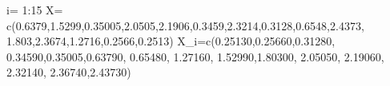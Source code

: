 \documentclass[
  a4paper,
  oneside,
  openany]{book}
\newenvironment{Shaded}{\begin{snugshade}}{\end{snugshade}}
\newcommand{\DecValTok}[1]{\textcolor[rgb]{0.00,0.00,0.81}{#1}}
\newcommand{\FloatTok}[1]{\textcolor[rgb]{0.00,0.00,0.81}{#1}}
\newcommand{\FunctionTok}[1]{\textcolor[rgb]{0.00,0.00,0.00}{#1}}
\newcommand{\NormalTok}[1]{#1}
\newcommand{\OtherTok}[1]{\textcolor[rgb]{0.56,0.35,0.01}{#1}}
\newcommand{\SpecialCharTok}[1]{\textcolor[rgb]{0.00,0.00,0.00}{#1}}
\begin{document}
\begin{Shaded}
\begin{Highlighting}[]
\NormalTok{i}\OtherTok{=} \DecValTok{1}\SpecialCharTok{:}\DecValTok{15}
\NormalTok{X}\OtherTok{=} \FunctionTok{c}\NormalTok{(}\FloatTok{0.6379}\NormalTok{,}\FloatTok{1.5299}\NormalTok{,}\FloatTok{0.35005}\NormalTok{,}\FloatTok{2.0505}\NormalTok{,}\FloatTok{2.1906}\NormalTok{,}\FloatTok{0.3459}\NormalTok{,}\FloatTok{2.3214}\NormalTok{,}\FloatTok{0.3128}\NormalTok{,}\FloatTok{0.6548}\NormalTok{,}\FloatTok{2.4373}\NormalTok{,}
               \FloatTok{1.803}\NormalTok{,}\FloatTok{2.3674}\NormalTok{,}\FloatTok{1.2716}\NormalTok{,}\FloatTok{0.2566}\NormalTok{,}\FloatTok{0.2513}\NormalTok{)}
\NormalTok{X\_i}\OtherTok{=}\FunctionTok{c}\NormalTok{(}\FloatTok{0.25130}\NormalTok{,}\FloatTok{0.25660}\NormalTok{,}\FloatTok{0.31280}\NormalTok{, }\FloatTok{0.34590}\NormalTok{,}\FloatTok{0.35005}\NormalTok{,}\FloatTok{0.63790}\NormalTok{, }\FloatTok{0.65480}\NormalTok{, }\FloatTok{1.27160}\NormalTok{, }
               \FloatTok{1.52990}\NormalTok{,}\FloatTok{1.80300}\NormalTok{, }\FloatTok{2.05050}\NormalTok{, }\FloatTok{2.19060}\NormalTok{, }\FloatTok{2.32140}\NormalTok{, }\FloatTok{2.36740}\NormalTok{,}\FloatTok{2.43730}\NormalTok{)}


\end{Highlighting}
\end{Shaded}
\end{document}
